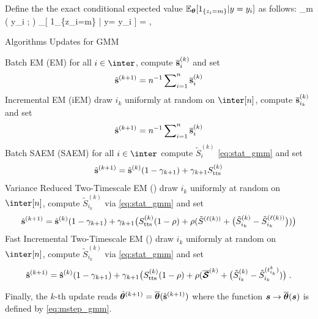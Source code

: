 \documentclass[journal, 11pt]{IEEEtran}
\makeatletter
\newcounter{protocol}
\newenvironment{protocol}[1][htb]{%
  \let\c@algorithm\c@protocol
  \renewcommand{\ALG@name}{Protocol}%
  \begin{algorithm}[#1]%
  }{\end{algorithm}
}
\makeatother
\begin{document}
Define the the exact conditional expected value $\mathbb{E}_{{\bm{\theta}}}[ 1_{\{z_i=m\}} | y= y_{i} ]$ as follows:
\beq \notag
\widetilde{\omega}_m ( y_{i} ; \param ) \eqdef \EE_{\param}[ 1_{\{z_i=m\}} | y= y_{i} ]
=  \eqsp,
\eeq


 \begin{protocol}[H]
\caption{Algorithms Updates for GMM}
  \begin{algorithmic}[1]
\STATE \textsf{Batch EM (EM)} \hspace{0.4cm} for all $i \in \inter$, compute $\overline{{\mathbf{s}}}_{i}^{(k)}$ and set $$\hat{{\mathbf{s}}}^{(k+1)} = n^{-1} \sum\nolimits_{i=1}^n \overline{{\mathbf{s}}}_i^{(k)}$$
\STATE \textsf{Incremental EM (iEM)} \hspace{0.4cm} draw  $i_k$ uniformly at random on $\inter[n]$, compute $\overline{{\mathbf{s}}}_{i_k}^{(k)}$ and set $$\hat{{\mathbf{s}}}^{(k+1)} = n^{-1} \sum\nolimits_{i=1}^n \overline{{\mathbf{s}}}_i^{(k)}$$
\STATE \textsf{Batch SAEM (SAEM)} \hspace{0.4cm} for all $i \in \inter$ compute $ \tilde{S}_{i}^{(k)}$ \eqref{eq:stat_gmm} and set  $$\hat{{\mathbf{s}}}^{(k+1)} = \hat{{\mathbf{s}}}^{(k)}(1 - \gamma_{k+1}) + \gamma_{k+1}S_{\textrm{tts}}^{(k)}$$
\STATE \textsf{Variance Reduced Two-Timescale EM (\SAEMVR)} \hspace{0.4cm} draw  $i_k$ uniformly at random on $\inter[n]$, compute $ \tilde{S}_{i_k}^{(k)}$ via \eqref{eq:stat_gmm} and set $$\hat{{\mathbf{s}}}^{(k+1)} = \hat{{\mathbf{s}}}^{(k)}(1 - \gamma_{k+1})+ \gamma_{k+1} \big(S_{\textrm{tts}}^{(k)} (1 - \rho) + \rho (\tilde{S}^{(\ell(k))} +  \big( \tilde{S}_{i_k}^{(k)}  -\tilde{S}_{i_k}^{(\ell(k))}   \big)) \big) $$
\STATE \textsf{Fast Incremental Two-Timescale EM (\FISAEM)} \hspace{0.4cm} draw  $i_k$ uniformly at random on $\inter[n]$, compute $ \tilde{S}_{i_k}^{(k)}$ via \eqref{eq:stat_gmm} and set $$ \hat{{\mathbf{s}}}^{(k+1)} = \hat{{\mathbf{s}}}^{(k)}(1 - \gamma_{k+1})+ \gamma_{k+1} \big(S_{\textrm{tts}}^{(k)} (1 - \rho) + \rho (\overline{{\bm{\mathcal{S}}}}^{(k)} + \big( \tilde{S}_{i_k}^{(k)}  - \tilde{S}_{i_k}^{(t_{i_k}^k)}) \big) \;.$$
  \end{algorithmic}
\end{protocol}


Finally, the $k$-th update reads $\hat{{\bm{\theta}}}^{(k+1)} = \overline{{\bm{\theta}}} (\hat{{\mathbf{s}}}^{(k+1)})$ where the function ${\bm s} \to \overline{{\bm{\theta}}}({\bm s})$ is defined by \eqref{eq:mstep_gmm}.
\end{document}
